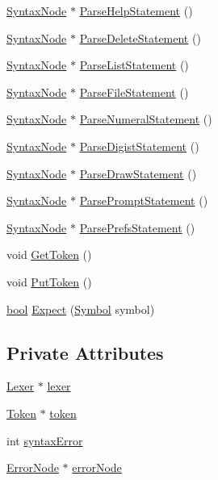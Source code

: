\begin{DoxyCompactItemize}
\hyperlink{classSyntaxNode}{Syntax\+Node} $\ast$ \hyperlink{classParser_a1e00b1a9ee0541508953564442312526}{Parse\+Help\+Statement} ()
\item 
\hyperlink{classSyntaxNode}{Syntax\+Node} $\ast$ \hyperlink{classParser_a41008319e22949c5a6045e3859335000}{Parse\+Delete\+Statement} ()
\item 
\hyperlink{classSyntaxNode}{Syntax\+Node} $\ast$ \hyperlink{classParser_aa0642d13c500401b168035f9fcdbe1f4}{Parse\+List\+Statement} ()
\item 
\hyperlink{classSyntaxNode}{Syntax\+Node} $\ast$ \hyperlink{classParser_a3c671b953bee260ed4eb3f5c30ededc2}{Parse\+File\+Statement} ()
\item 
\hyperlink{classSyntaxNode}{Syntax\+Node} $\ast$ \hyperlink{classParser_ae2a3cdedfb708c19c7552fd402a224c6}{Parse\+Numeral\+Statement} ()
\item 
\hyperlink{classSyntaxNode}{Syntax\+Node} $\ast$ \hyperlink{classParser_a14aa2850063f998f76530e027c3ef399}{Parse\+Digist\+Statement} ()
\item 
\hyperlink{classSyntaxNode}{Syntax\+Node} $\ast$ \hyperlink{classParser_a38a55851f31c226c193090403dfbaff8}{Parse\+Draw\+Statement} ()
\item 
\hyperlink{classSyntaxNode}{Syntax\+Node} $\ast$ \hyperlink{classParser_a3ff34c9305bf6b5f10aacf27e5d20c28}{Parse\+Prompt\+Statement} ()
\item 
\hyperlink{classSyntaxNode}{Syntax\+Node} $\ast$ \hyperlink{classParser_ab655f0d3ad73a8ec8a299d2e2e3248ea}{Parse\+Prefs\+Statement} ()
\item 
void \hyperlink{classParser_a415a103e66558b4d366d9a1420561fe3}{Get\+Token} ()
\item 
void \hyperlink{classParser_adb5c3a188b36f7ecb198ae30f06338b3}{Put\+Token} ()
\item 
\hyperlink{platform_8h_a1062901a7428fdd9c7f180f5e01ea056}{bool} \hyperlink{classParser_a811765334b0cd3f01152c35c9f5bcaec}{Expect} (\hyperlink{lex_8h_a7feef761cd73fac6e25b8bb80d2c4e54}{Symbol} symbol)
\end{DoxyCompactItemize}
\subsection*{Private Attributes}
\begin{DoxyCompactItemize}
\item 
\hyperlink{classLexer}{Lexer} $\ast$ \hyperlink{classParser_a8a8214126b0b0455e3ce375f3e9b20bf}{lexer}
\item 
\hyperlink{structToken}{Token} $\ast$ \hyperlink{classParser_a467028559d31c5b33f16ca8be56715cc}{token}
\item 
int \hyperlink{classParser_ae50a199b804c9f5e8342a4d0a1ae6a95}{syntax\+Error}
\item 
\hyperlink{classErrorNode}{Error\+Node} $\ast$ \hyperlink{classParser_ab482ff79113ad2f1ef60bc6dd18528d1}{error\+Node}
\end{DoxyCompactItemize}


